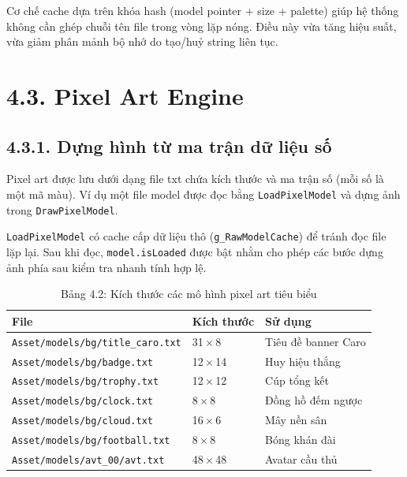 \setlength{\parindent}{1.5em} Cơ chế cache dựa trên khóa hash (model pointer + size + palette) giúp hệ thống không cần ghép chuỗi tên file trong vòng lặp nóng. Điều này vừa tăng hiệu suất, vừa giảm phân mảnh bộ nhớ do tạo/huỷ string liên tục.

\section*{4.3. Pixel Art Engine}

\subsection*{4.3.1. Dựng hình từ ma trận dữ liệu số}

\setlength{\parindent}{1.5em} Pixel art được lưu dưới dạng file txt chứa kích thước và ma trận số (mỗi số là một mã màu). Ví dụ một file model được đọc bằng \texttt{LoadPixelModel} và dựng ảnh trong \texttt{DrawPixelModel}.

\setlength{\parindent}{1.5em} \texttt{LoadPixelModel} có cache cấp dữ liệu thô (\texttt{g\_RawModelCache}) để tránh đọc file lặp lại. Sau khi đọc, \texttt{model.isLoaded} được bật nhằm cho phép các bước dựng ảnh phía sau kiểm tra nhanh tính hợp lệ.

\begin{table}[H]
\caption*{Bảng 4.2: Kích thước các mô hình pixel art tiêu biểu}
\label{tbl:ch4_pixel_models}
\centering
\renewcommand{\arraystretch}{0.9}
\begin{tabularx}{\linewidth}{|L{8.0cm}|L{3.0cm}|X|}
\hline
\textbf{File} & \textbf{Kích thước} & \textbf{Sử dụng} \\ \hline
\texttt{Asset/models/bg/title\_caro.txt} & 31\,$\times$\,8 & Tiêu đề banner Caro \\ \hline
\texttt{Asset/models/bg/badge.txt} & 12\,$\times$\,14 & Huy hiệu thắng \\ \hline
\texttt{Asset/models/bg/trophy.txt} & 12\,$\times$\,12 & Cúp tổng kết \\ \hline
\texttt{Asset/models/bg/clock.txt} & 8\,$\times$\,8 & Đồng hồ đếm ngược \\ \hline
\texttt{Asset/models/bg/cloud.txt} & 16\,$\times$\,6 & Mây nền sân \\ \hline
\texttt{Asset/models/bg/football.txt} & 8\,$\times$\,8 & Bóng khán đài \\ \hline
\texttt{Asset/models/avt\_00/avt.txt} & 48\,$\times$\,48 & Avatar cầu thủ \\ \hline
\end{tabularx}
\end{table}

